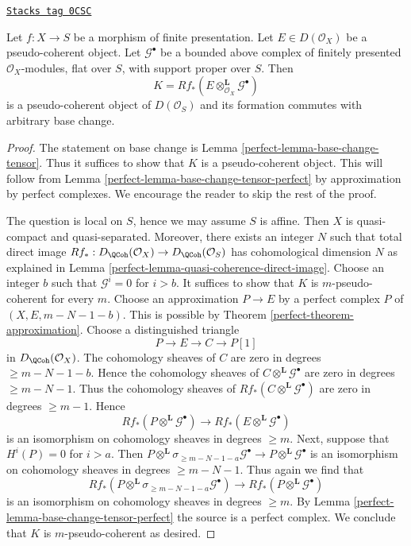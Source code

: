 \begin{lemma}
\label{perfect-lemma-base-change-tensor-pseudo-coherent}
\href{https://stacks.math.columbia.edu/tag/0CSC}{\texttt{Stacks tag 0CSC}}

Let $f : X \to S$ be a morphism of finite presentation.
Let $E \in D(\mathcal{O}_X)$ be a pseudo-coherent object.
Let $\mathcal{G}^\bullet$ be a bounded above complex of
finitely presented $\mathcal{O}_X$-modules, flat over $S$,
with support proper over $S$. Then
$$
K = Rf_*(E \otimes_{\mathcal{O}_X}^\mathbf{L} \mathcal{G}^\bullet)
$$
is a pseudo-coherent object of $D(\mathcal{O}_S)$ and its formation
commutes with arbitrary base change.
\end{lemma}

\begin{proof}

The statement on base change is Lemma \ref{perfect-lemma-base-change-tensor}.
Thus it suffices to show that $K$ is a pseudo-coherent object.
This will follow from Lemma \ref{perfect-lemma-base-change-tensor-perfect}
by approximation by perfect complexes. We encourage the reader to
skip the rest of the proof.

\medskip\noindent
The question is local on $S$, hence we may assume $S$ is affine.
Then $X$ is quasi-compact and quasi-separated. Moreover, there
exists an integer $N$ such that total direct image
$Rf_* : D_\QCoh(\mathcal{O}_X) \to D_\QCoh(\mathcal{O}_S)$
has cohomological dimension $N$ as explained in
Lemma \ref{perfect-lemma-quasi-coherence-direct-image}.
Choose an integer $b$ such that $\mathcal{G}^i = 0$ for $i > b$.
It suffices to show that $K$ is $m$-pseudo-coherent for
every $m$. Choose an approximation $P \to E$ by a perfect complex $P$
of $(X, E, m - N - 1 - b)$. This is possible by
Theorem \ref{perfect-theorem-approximation}.
Choose a distinguished triangle
$$
P \to E \to C \to P[1]
$$
in $D_\QCoh(\mathcal{O}_X)$. The cohomology sheaves of $C$ are zero
in degrees $\geq m - N - 1 - b$. Hence the cohomology sheaves of
$C \otimes^\mathbf{L} \mathcal{G}^\bullet$ are zero in degrees
$\geq m - N - 1$. Thus the cohomology sheaves of
$Rf_*(C \otimes^\mathbf{L} \mathcal{G}^\bullet)$
are zero in degrees $\geq m - 1$.
Hence
$$
Rf_*(P \otimes^\mathbf{L} \mathcal{G}^\bullet) \to
Rf_*(E \otimes^\mathbf{L} \mathcal{G}^\bullet)
$$
is an isomorphism on cohomology sheaves in degrees $\geq m$.
Next, suppose that $H^i(P) = 0$ for $i > a$. Then
$
P \otimes^\mathbf{L} \sigma_{\geq m - N - 1 - a}\mathcal{G}^\bullet
\longrightarrow
P \otimes^\mathbf{L} \mathcal{G}^\bullet
$
is an isomorphism on cohomology sheaves in degrees $\geq m - N - 1$.
Thus again we find that
$$
Rf_*(P \otimes^\mathbf{L} \sigma_{\geq m - N - 1 - a}\mathcal{G}^\bullet) \to
Rf_*(P \otimes^\mathbf{L} \mathcal{G}^\bullet)
$$
is an isomorphism on cohomology sheaves in degrees $\geq m$.
By Lemma \ref{perfect-lemma-base-change-tensor-perfect} the source
is a perfect complex.
We conclude that $K$ is $m$-pseudo-coherent as desired.
\end{proof}

